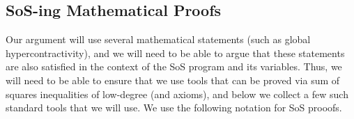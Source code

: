 


\subsection{SoS-ing Mathematical Proofs}
Our argument will use several mathematical statements (such 
as global hypercontractivity), and we will need to be 
able to argue that these statements are also satisfied 
in the context of the SoS program and its variables. Thus, 
we will need to be able to ensure that we use tools that can 
be proved via sum of squares inequalities of low-degree (and 
axioms), and below we collect a few such standard tools that we will use. We use the following notation for SoS prooofs.

